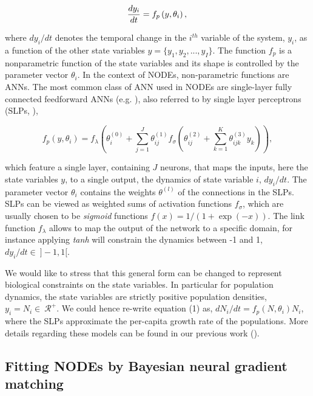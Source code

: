 \documentclass[11pt, oneside]{article}
\begin{document}
\vspace{-0.5cm}
\begin{equation}
    \frac{dy_i}{dt} = f_p \left(y,\theta_i \right), \\
\end{equation}

where $dy_i/dt$ denotes the temporal change in the $i^{th}$ variable of the system, $y_i$, as a function of the other state variables $y = \{ y_1, y_2, ..., y_I\}$.
The function $f_p$ is a nonparametric function of the state variables and its shape is controlled by the parameter vector $\theta_i$.
In the context of NODEs, non-parametric functions are ANNs.
The most common class of ANN used in NODEs are single-layer fully connected feedforward ANNs (e.g. \cite{Wu2005}), also referred to by single layer perceptrons (SLPs, \cite{Bonnaffe2021a}),

\vspace{-0.5cm}
\begin{equation}
    f_p \left(y, \theta_i \right) = f_\lambda \left( \theta_i^{(0)} + \sum_{j=1}^{J} \theta^{(1)}_{ij} f_\sigma \left( \theta^{(2)}_{ij} + \sum_{k=1}^{K} \theta^{(3)}_{ijk} y_k \right) \right),
\end{equation}

which feature a single layer, containing $J$ neurons, that maps the inputs, here the state variables $y$, to a single output, the dynamics of state variable $i$, $dy_i/dt$.
The parameter vector $\theta_i$ contains the weights $\theta^{(l)}$ of the connections in the SLPs.
SLPs can be viewed as weighted sums of activation functions $f_\sigma$, which are usually chosen to be \textit{sigmoid} functions $f(x) = 1/(1+\exp(-x))$.
The link function $f_\lambda$ allows to map the output of the network to a specific domain, for instance applying \textit{tanh} will constrain the dynamics between -1 and 1, $dy_i/dt \in~]-1,1[$. 

We would like to stress that this general form can be changed to represent biological constraints on the state variables.
In particular for population dynamics, the state variables are strictly positive population densities, $y_i = N_i \in~\mathcal{R^+}$.
We could hence re-write equation (1) as, $dN_i/dt = f_p(N,\theta_i)N_i$, where the SLPs approximate the per-capita growth rate of the populations.
More details regarding these models can be found in our previous work (\cite{Bonnaffe2021a}).


\subsection{Fitting NODEs by Bayesian neural gradient matching}
\end{document}
